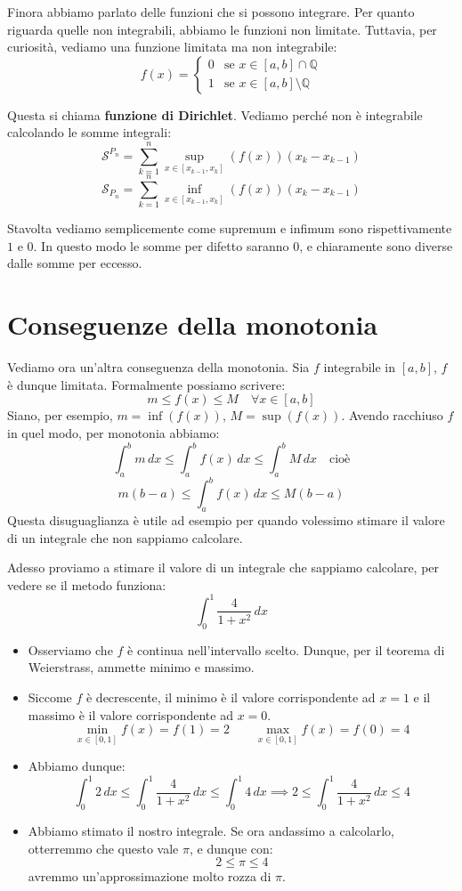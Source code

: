 \documentclass[12pt]{report}
\newcommand{\Q}{\mathbb{Q}}
\begin{document}
	Finora abbiamo parlato delle funzioni che si possono integrare. Per quanto riguarda quelle non integrabili, abbiamo le funzioni non limitate. Tuttavia, per curiosità, vediamo una funzione limitata ma non integrabile:
	\[
	f(x) = \begin{cases}
		0 & \text{se } x \in [a, b] \cap \Q \\
		1 & \text{se } x \in [a, b] \setminus \Q
	\end{cases}
	\]
	
	Questa si chiama \textbf{funzione di Dirichlet}. Vediamo perché non è integrabile calcolando le somme integrali:
	\[
	\mathcal{S}^{P_n} = \sum_{k=1}^n \sup_{x \in [x_{k-1}, x_k]} (f(x)) (x_k - x_{k-1})
	\]
	\[
	\mathcal{S}_{P_n} = \sum_{k=1}^n \inf_{x \in [x_{k-1}, x_k]} (f(x)) (x_k - x_{k-1})
	\]
	
	Stavolta vediamo semplicemente come supremum e infimum sono rispettivamente $1$ e $0$. In questo modo le somme per difetto saranno $0$, e chiaramente sono diverse dalle somme per eccesso.
	
	\section{Conseguenze della monotonia}
	Vediamo ora un'altra conseguenza della monotonia. Sia $f$ integrabile in $[a, b]$, $f$ è dunque limitata. Formalmente possiamo scrivere:
	\[
	m \le f(x) \le M \quad \forall x \in [a, b]
	\]
	Siano, per esempio, $m = \inf(f(x))$, $M = \sup(f(x))$. Avendo racchiuso $f$ in quel modo, per monotonia abbiamo:
	\[
	\int_a^b m \, dx \le \int_a^b f(x) \, dx \le \int_a^b M \, dx \quad \text{cioè}
	\]
	\[
	m(b-a) \le \int_a^b f(x) \, dx \le M(b-a)
	\]
	Questa disuguaglianza è utile ad esempio per quando volessimo stimare il valore di un integrale che non sappiamo calcolare.
	
	Adesso proviamo a stimare il valore di un integrale che sappiamo calcolare, per vedere se il metodo funziona:
	\[
	\int_{0}^{1} \frac{4}{1 + x^2} \, dx
	\]
	
	\begin{itemize}
		
		\item Osserviamo che $f$ è continua nell'intervallo scelto. Dunque, per il teorema di Weierstrass, ammette minimo e massimo.
		
		\item Siccome $f$ è decrescente, il minimo è il valore corrispondente ad $x = 1$ e il massimo è il valore corrispondente ad $x = 0$.
		\[
		\min_{x \in [0, 1]} f(x) = f(1) = 2 \qquad \max_{x \in [0, 1]} f(x) = f(0) = 4
		\]
		
		\item Abbiamo dunque:
		\[
		\int_{0}^{1} 2 \, dx \leq \int_{0}^{1} \frac{4}{1 + x^2} \, dx \leq \int_{0}^{1} 4 \, dx \implies 2 \leq \int_{0}^{1} \frac{4}{1 + x^2} \, dx \leq 4
		\]
		
		\item Abbiamo stimato il nostro integrale. Se ora andassimo a calcolarlo, otterremmo che questo vale $\pi$, e dunque con:
		\[
		2 \leq \pi \leq 4
		\]
		avremmo un'approssimazione molto rozza di $\pi$.
		
	\end{itemize}
	
\end{document}
